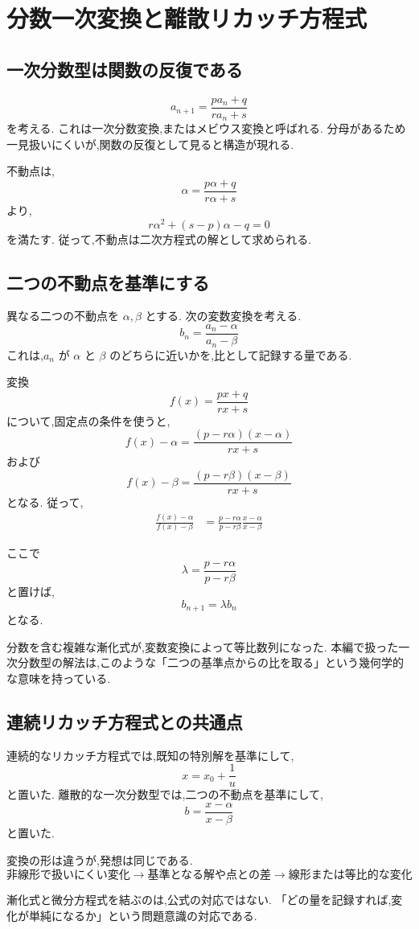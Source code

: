
\section{分数一次変換と離散リカッチ方程式}

\subsection{一次分数型は関数の反復である}

\[
  a_{n+1}=\frac{pa_n+q}{ra_n+s}
\]
を考える.
これは一次分数変換,またはメビウス変換と呼ばれる.
分母があるため一見扱いにくいが,関数の反復として見ると構造が現れる.

不動点は,
\[
  \alpha=\frac{p\alpha+q}{r\alpha+s}
\]
より,
\[
  r\alpha^2+(s-p)\alpha-q=0
\]
を満たす.
従って,不動点は二次方程式の解として求められる.

\subsection{二つの不動点を基準にする}

異なる二つの不動点を $\alpha,\beta$ とする.
次の変数変換を考える.
\[
  b_n=\frac{a_n-\alpha}{a_n-\beta}
\]
これは,$a_n$ が $\alpha$ と $\beta$ のどちらに近いかを,比として記録する量である.

変換
\[
  f(x)=\frac{px+q}{rx+s}
\]
について,固定点の条件を使うと,
\[
  f(x)-\alpha
  =
  \frac{(p-r\alpha)(x-\alpha)}{rx+s}
\]
および
\[
  f(x)-\beta
  =
  \frac{(p-r\beta)(x-\beta)}{rx+s}
\]
となる.
従って,
\[
  \begin{aligned}
    \frac{f(x)-\alpha}{f(x)-\beta}
     & =
    \frac{p-r\alpha}{p-r\beta}
    \frac{x-\alpha}{x-\beta}
  \end{aligned}
\]

ここで
\[
  \lambda=\frac{p-r\alpha}{p-r\beta}
\]
と置けば,
\[
  b_{n+1}=\lambda b_n
\]
となる.

分数を含む複雑な漸化式が,変数変換によって等比数列になった.
本編で扱った一次分数型の解法は,このような「二つの基準点からの比を取る」という幾何学的な意味を持っている.

\subsection{連続リカッチ方程式との共通点}

連続的なリカッチ方程式では,既知の特別解を基準にして,
\[
  x=x_0+\frac1u
\]
と置いた.
離散的な一次分数型では,二つの不動点を基準にして,
\[
  b=\frac{x-\alpha}{x-\beta}
\]
と置いた.

変換の形は違うが,発想は同じである.
\[
  \text{非線形で扱いにくい変化}
  \longrightarrow
  \text{基準となる解や点との差}
  \longrightarrow
  \text{線形または等比的な変化}
\]

漸化式と微分方程式を結ぶのは,公式の対応ではない.
「どの量を記録すれば,変化が単純になるか」という問題意識の対応である.
